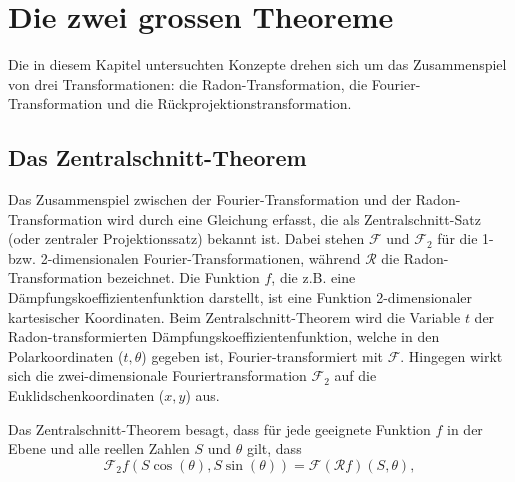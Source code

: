 %
%
%
%
\section{Die zwei grossen Theoreme
	\label{ct:section:theoreme}}
Die in diesem Kapitel untersuchten Konzepte drehen sich um das Zusammenspiel von drei Transformationen: die Radon-Transformation, die Fourier-Transformation und die Rückprojektionstransformation.

\subsection{Das Zentralschnitt-Theorem
	\label{ct:subsection:zentralschnitt}}
Das Zusammenspiel zwischen der Fourier-Transformation und der Radon-Transformation wird durch eine Gleichung erfasst, die als Zentralschnitt-Satz (oder zentraler Projektionssatz) bekannt ist. Dabei stehen $\mathscr{F}$ und $\mathscr{F}_2$ für die 1- bzw. 2-dimensionalen Fourier-Transformationen, während $\mathscr{R}$ die Radon-Transformation bezeichnet. Die Funktion $f$, die z.B. eine Dämpfungskoeffizientenfunktion darstellt, ist eine Funktion 2-dimensionaler kartesischer Koordinaten.
Beim Zentralschnitt-Theorem wird die Variable $t$ der Radon-transformierten Dämpfungskoeffizientenfunktion, welche in den Polarkoordinaten ($t, \theta$) gegeben ist, Fourier-transformiert mit $\mathscr{F}$. 
Hingegen wirkt sich die zwei-dimensionale Fouriertransformation  $\mathscr{F}_2$ auf die Euklidschenkoordinaten ($x, y$) aus.

\begin{satz}
Das Zentralschnitt-Theorem besagt, dass für jede geeignete Funktion $f$ in der Ebene und alle reellen Zahlen $S$ und $\theta$ gilt, dass
	\begin{equation}\label{2dFourier1}
		\mathscr{F}_2f(S\cos(\theta), S\sin(\theta)) = \mathscr{F}(\mathscr{R}f)(S, \theta),
	\end{equation}
\end{satz}

